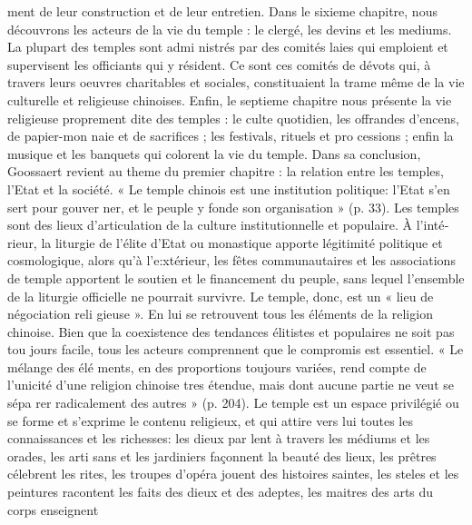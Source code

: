 ment de leur construction et de leur entretien.
Dans le sixieme chapitre, nous découvrons les acteurs de la vie du temple : le clergé, les devins et les mediums. La plupart des temples sont admi­ nistrés par des comités laies qui emploient et supervisent les officiants qui y résident. Ce sont ces comités de dévots qui, à travers leurs oeuvres charitables et sociales, constituaient la trame même de la vie culturelle et religieuse chinoises. Enfin, le septieme chapitre nous présente la vie religieuse proprement dite des temples : le culte quotidien, les offrandes d'encens, de papier-mon­ naie et de sacrifices ; les festivals, rituels et pro­ cessions ; enfin la musique et les banquets qui colorent la vie du temple.
Dans sa conclusion, Goossaert revient au theme du premier chapitre : la relation entre les temples, l'Etat et la société. « Le temple chinois est une institution politique: l'Etat s'en sert pour gouver­ ner, et le peuple y fonde son organisation » (p. 33). Les temples sont des lieux d'articulation de la culture institutionnelle et populaire. À l'inté­ rieur, la liturgie de l'élite d'Etat ou monastique apporte légitimité politique et cosmologique, alors qu'à l'e:xtérieur, les fêtes communautaires et les associations de temple apportent le soutien et le financement du peuple, sans lequel l'ensemble de la liturgie officielle ne pourrait survivre. Le temple, donc, est un « lieu de négociation reli­ gieuse ». En lui se retrouvent tous les éléments de la religion chinoise. Bien que la coexistence des tendances élitistes et populaires ne soit pas tou­ jours facile, tous les acteurs comprennent que le compromis est essentiel. « Le mélange des élé­ ments, en des proportions toujours variées, rend compte de l'unicité d'une religion chinoise tres étendue, mais dont aucune partie ne veut se sépa­ rer radicalement des autres » (p. 204). Le temple est un espace privilégié ou se forme et s'exprime le contenu religieux, et qui attire vers lui toutes les connaissances et les richesses: les dieux par­ lent à travers les médiums et les orades, les arti­ sans et les jardiniers façonnent la beauté des lieux, les prêtres célebrent les rites, les troupes d'opéra jouent des histoires saintes, les steles et les peintures racontent les faits des dieux et des adeptes, les maitres des arts du corps enseignent
